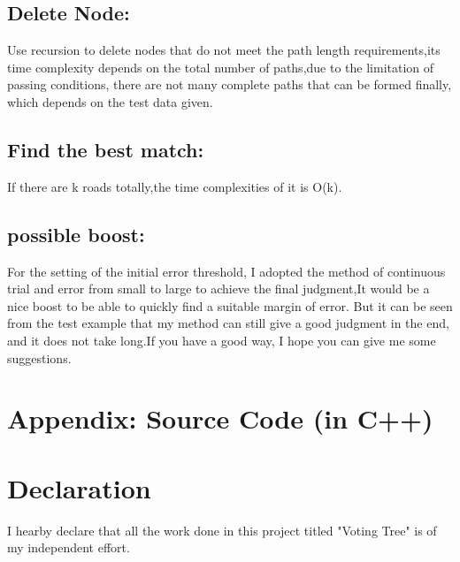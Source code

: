 \documentclass[12pt]{article}
\begin{document}
\subsection*{Delete Node:}
Use recursion to delete nodes that do not meet the path length requirements,its time complexity depends on the total number of paths,due to the limitation of passing conditions, there are not many complete paths that can be formed finally, which depends on the test data given.

\subsection*{Find the best match:}
If there are k roads totally,the time complexities of it is O(k).

\subsection*{possible boost:}
For the setting of the initial error threshold, I adopted the method of continuous trial and error from small to large to achieve the final judgment,It would be a nice boost to be able to quickly find a suitable margin of error.
But it can be seen from the test example that my method can still give a good judgment in the end, and it does not take long.If you have a good way, I hope you can give me some suggestions.
\section*{Appendix: Source Code (in C++)}



\section*{Declaration}
I hearby declare that all the work done in this project titled "Voting Tree" is of my independent effort.
\end{document}
